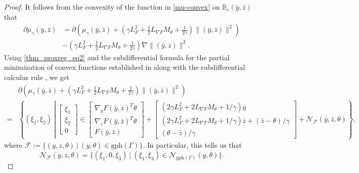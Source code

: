 \documentclass[11pt,a4paper]{article}
\def\disp{\displaystyle}
\theoremstyle{plain}
\begin{document}
\begin{proof}
It follows from the convexity of the function in \eqref{mu-convex} on $\mathbb{B}_{\varepsilon}(\bar{y}, \bar{z})$ that
\begin{equation}\label{thm_proxreg_eq3}
\begin{array}{ll}
\disp\partial \mu_\gamma(\bar{y}, \bar{z})& = \partial \left(  \mu_\gamma(\bar{y}, \bar{z}) + \left(  \gamma L_F^2 + \disp\frac{1}{2}L_{\nabla F}M_\theta + \frac{1}{2\gamma}\right)\|(\bar{y}, \bar{z})\|^2 \right)\\
&-\disp\left(  \gamma L_F^2 + \frac{1}{2}L_{\nabla F}M_\theta + \frac{1}{2\gamma}\right) \nabla \|(\bar{y}, \bar{z})\|^2.
\end{array}
\end{equation}
Using \eqref{thm_proxreg_eq2} and the subdifferential formula for the partial minimization of convex functions established in \cite[Theorem~2.61]{mordukhovich2023easy} along with the subdifferential calculus rule 
\cite[Theorem~3.18]{mordukhovich2023easy}, we get
\begin{equation}\label{thm_proxreg_eq4}
\begin{aligned}
&\partial \left(  \mu_\gamma(\bar{y}, \bar{z})+ \left(  \gamma L_F^2 + \frac{1}{2}L_{\nabla F}M_\theta + \frac{1}{2\gamma}\right)\|(\bar{y}, \bar{z})\|^2 \right) \\
= &\left\{ (\xi_1, \xi_2) ~\left| ~
\begin{bmatrix}
\xi_1 \\ \xi_2 \\0 
\end{bmatrix} \!\in\! 
\begin{bmatrix}
\nabla_y F(\bar{y}, \bar{z})^T \theta \\ \nabla_z F(\bar{y}, \bar{z})^T \theta \\ F(\bar{y}, \bar{z})
\end{bmatrix} \!+\! 
\begin{bmatrix}
\left(2\gamma L_F^2 + 2L_{\nabla F}M_\theta + 1/\gamma \right) \bar{y} \\
\left(2\gamma L_F^2 + 2L_{\nabla F}M_\theta + 1/\gamma \right) \bar{z} + (\bar{z} - \theta)/\gamma \\
(\theta - \bar{z})/\gamma
\end{bmatrix} \!+\! \mathcal{N}_{\mathcal{F}}(\bar y, \bar{z}, \theta)
\right.\right\},
\end{aligned}
\end{equation}
where $\mathcal{F}:= \{(y,z,\theta) ~|~ (y,\theta) \in \mathrm{gph}(\Gamma)\}$. In particular, this tells us that
$$
\mathcal{N}_{\mathcal{F}}( y, z, \theta) = \{ (\xi_1, 0, \xi_3)~|~ (\xi_1,\xi_3) \in \mathcal{N}_{\mathrm{gph}(\Gamma)}(y,\theta)\}.
$$
\end{proof}
\end{document}
